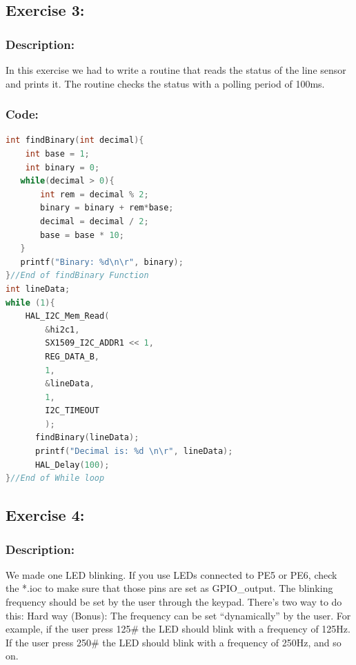 \documentclass[english]{article}
\begin{document}
\subsection{Exercise 3:}
\subsubsection{Description:}
In this exercise we had to write a routine that reads the status of the 
line sensor and prints it. The routine checks the status with a polling
 period of 100ms.
\subsubsection{Code:}
\begin{lstlisting}[language=C, caption={Reading Line Data}, label={lst:ReadLine} ]
int findBinary(int decimal){
	int base = 1;
	int binary = 0;
   while(decimal > 0){
	   int rem = decimal % 2;
	   binary = binary + rem*base;
	   decimal = decimal / 2;
	   base = base * 10;
   }
   printf("Binary: %d\n\r", binary);
}//End of findBinary Function
int lineData;
while (1){
    HAL_I2C_Mem_Read(
        &hi2c1,
        SX1509_I2C_ADDR1 << 1,
        REG_DATA_B,
        1,
        &lineData,
        1,
        I2C_TIMEOUT
        );
	  findBinary(lineData);
	  printf("Decimal is: %d \n\r", lineData);
	  HAL_Delay(100);
}//End of While loop
\end{lstlisting}


\newpage
\subsection{Exercise 4:}
\subsubsection{Description:}
We made one LED blinking. If you use LEDs connected to PE5 or PE6, check the *.ioc to make sure that those pins are set as GPIO\_output. The blinking frequency should be
set by the user through the keypad. There’s two way to do this:
Hard way (Bonus): The frequency can be set “dynamically” by the user. For example, if the user
press 125\# the LED should blink with a frequency of 125Hz. If the user press 250\# the LED should
blink with a frequency of 250Hz, and so on.
\end{document}
